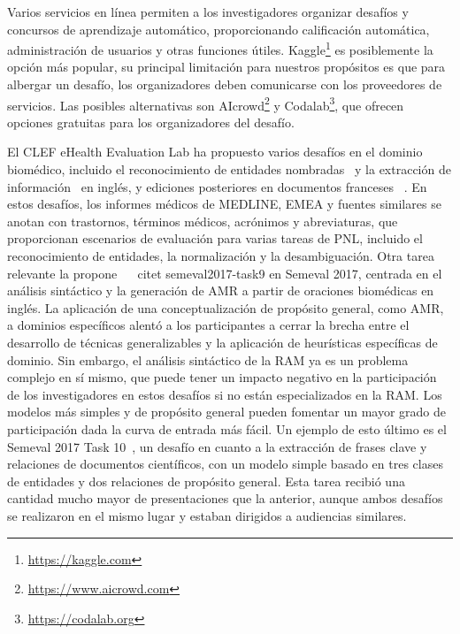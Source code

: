Varios servicios en línea permiten a los investigadores organizar desafíos y concursos de aprendizaje automático, proporcionando calificación automática, administración de usuarios y otras funciones útiles. Kaggle\footnote{\url {https://kaggle.com}} es posiblemente la opción más popular, su principal limitación para nuestros propósitos es que para albergar un desafío, los organizadores deben comunicarse con los proveedores de servicios. Las posibles alternativas son AIcrowd\footnote{\url{https://www.aicrowd.com}} y Codalab\footnote{\url{https://codalab.org}}, que ofrecen opciones gratuitas para los organizadores del desafío.

El CLEF eHealth Evaluation Lab ha propuesto varios desafíos en el dominio biomédico, incluido el reconocimiento de entidades nombradas~\cite{clef2013} y la extracción de información~\cite{clef2014} en inglés, y ediciones posteriores en documentos franceses~\cite{clef2015, clef2016} . En estos desafíos, los informes médicos de MEDLINE, EMEA y fuentes similares se anotan con trastornos, términos médicos, acrónimos y abreviaturas, que proporcionan escenarios de evaluación para varias tareas de PNL, incluido el reconocimiento de entidades, la normalización y la desambiguación. Otra tarea relevante la propone ~ \ citet {semeval2017-task9} en Semeval 2017, centrada en el análisis sintáctico y la generación de AMR a partir de oraciones biomédicas en inglés. La aplicación de una conceptualización de propósito general, como AMR, a dominios específicos alentó a los participantes a cerrar la brecha entre el desarrollo de técnicas generalizables y la aplicación de heurísticas específicas de dominio. Sin embargo, el análisis sintáctico de la RAM ya es un problema complejo en sí mismo, que puede tener un impacto negativo en la participación de los investigadores en estos desafíos si no están especializados en la RAM. Los modelos más simples y de propósito general pueden fomentar un mayor grado de participación dada la curva de entrada más fácil. Un ejemplo de esto último es el Semeval 2017 Task 10~\cite{semeval2017-task10}, un desafío en cuanto a la extracción de frases clave y relaciones de documentos científicos, con un modelo simple basado en tres clases de entidades y dos relaciones de propósito general. Esta tarea recibió una cantidad mucho mayor de presentaciones que la anterior, aunque ambos desafíos se realizaron en el mismo lugar y estaban dirigidos a audiencias similares.

